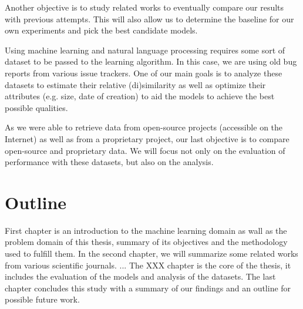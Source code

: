 Another objective is to study related works to eventually compare our results with previous attempts. This will also allow us to determine the baseline for our own experiments and pick the best candidate models.

Using machine learning and natural language processing requires some sort of dataset to be passed to the learning algorithm. In this case, we are using old bug reports from various issue trackers. One of our main goals is to analyze these datasets to estimate their relative (di)similarity as well as optimize their attributes (e.g. size, date of creation) to aid the models to achieve the best possible qualities.

As we were able to retrieve data from open-source projects (accessible on the Internet) as well as from a proprietary project, our last objective is to compare open-source and proprietary data. We will focus not only on the evaluation of performance with these datasets, but also on the analysis.

\section{Outline}

First chapter is an introduction to the machine learning domain as wall as the problem domain of this thesis, summary of its objectives and the methodology used to fulfill them. In the second chapter, we will summarize some related works from various scientific journals. ... The XXX chapter is the core of the thesis, it includes the evaluation of the models and analysis of the datasets. The last chapter concludes this study with a summary of our findings and an outline for possible future work.